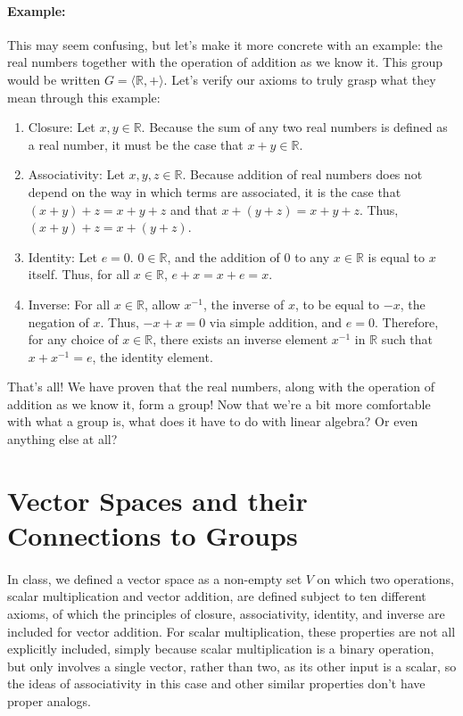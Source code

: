 \documentclass{article}
\newcommand{\R}{\mathbb{R}}
\begin{document}
\paragraph*{Example:}
This may seem confusing, but let's make it more concrete with an example: 
the real numbers together with the operation of addition as we know it. This 
group would be written $G = \langle \R, +\rangle$. Let's verify our axioms 
to truly grasp what they mean through this example:
\begin{enumerate}
    \item Closure: Let $x,y\in\R$. Because the sum of any two real numbers 
    is defined as a real number, it must be the case that $x+y\in\R$. 
    \item Associativity: Let $x,y,z\in\R$. Because addition of real numbers 
    does not depend on the way in which terms are associated, it is the case 
    that $(x+y)+z = x+y+z$ and that $x+(y+z)=x+y+z$. Thus, $(x+y)+z=x+(y+z)$. 
    \item Identity: Let $e = 0$. $0\in\R$, and the addition of 0 to any $x\in\R$
    is equal to $x$ itself. Thus, for all $x\in\R$, $e+x=x+e=x$. 
    \item Inverse: For all $x\in\R$, allow $x^{-1}$, the inverse of $x$, to be equal 
    to $-x$, the negation of $x$. Thus, $-x+x=0$ via simple addition, and $e=0$.
    Therefore, for any choice of $x\in\R$, there exists an inverse element $x^{-1}$ in $\R$
    such that $x+ x^{-1} =e$, the identity element. 
\end{enumerate}
That's all! We have proven that the real numbers, along with the operation of 
addition as we know it, form a group! Now that we're a bit more comfortable with 
what a group is, what does it have to do with linear algebra? Or even anything 
else at all?

\section{Vector Spaces and their Connections to Groups}

\paragraph*{} In class, we defined a vector space as a non-empty set $V$ on which two operations,
scalar multiplication and vector addition, are defined subject to ten different axioms,
of which the principles of closure, associativity, identity, and inverse are included 
for vector addition. For scalar multiplication, these properties are not all explicitly
included, simply because scalar multiplication is a binary operation, but only involves 
a single vector, rather than two, as its other input is a scalar, so the ideas of 
associativity in this case and other similar properties don't have proper analogs.
\end{document}
